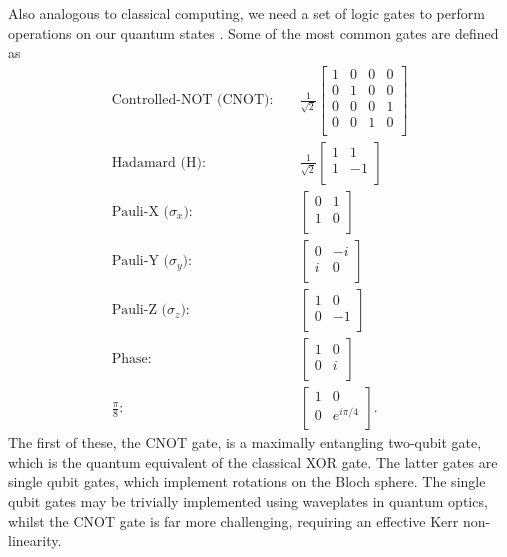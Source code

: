 \documentclass[aps,pra,twocolumn,amsmath,amssymb,nofootinbib,superscriptaddress]{revtex4}
\begin{document}
 Also analogous to classical computing, we need a set of logic gates to perform operations on our quantum states \cite{nielsen}. Some of the most common gates are defined as
\begin{eqnarray}
\textrm{Controlled-NOT (CNOT):} && \frac{1}{\sqrt{2}}\left[ 
\begin{array}{cccc}
1 & 0 & 0 & 0 \\
0 & 1 & 0 & 0 \\
0 & 0 & 0 & 1 \\
0 & 0 & 1 & 0 \\
\end{array} \right] \\ \nonumber
\textrm{Hadamard (H):} &&  \frac{1}{\sqrt{2}}\left[ 
\begin{array}{cc}
1&1 \\
1&-1 \\
\end{array} \right] \\ \nonumber
\textrm{Pauli-X ($\sigma_x$):} && \left[
\begin{array}{cc}
0&1\\
1&0\\
\end{array} \right] \\ \nonumber
\textrm{Pauli-Y ($\sigma_y$):} && \left[
\begin{array}{cc}
0&-i\\
i&0\\
\end{array} \right] \\ \nonumber
\textrm{Pauli-Z ($\sigma_z$):} && \left[
\begin{array}{cc}
1&0\\
0&-1\\
\end{array} \right] \\ \nonumber
\textrm{Phase:} && \left[
\begin{array}{cc}
1&0\\
0&i\\
\end{array} \right] \\
\frac{\pi}{8}: &\;& \left[
\begin{array}{cc}
1&0\\
0&e^{i \pi/4} \\
\end{array} \right]. \nonumber
\end{eqnarray}
The first of these, the CNOT gate, is a maximally entangling two-qubit gate, which is the quantum equivalent of the classical XOR gate.  The latter gates are single qubit gates, which implement rotations on the Bloch sphere. The single qubit gates may be trivially implemented using waveplates in quantum optics, whilst the CNOT gate is far more challenging, requiring an effective Kerr non-linearity.
\end{document}
